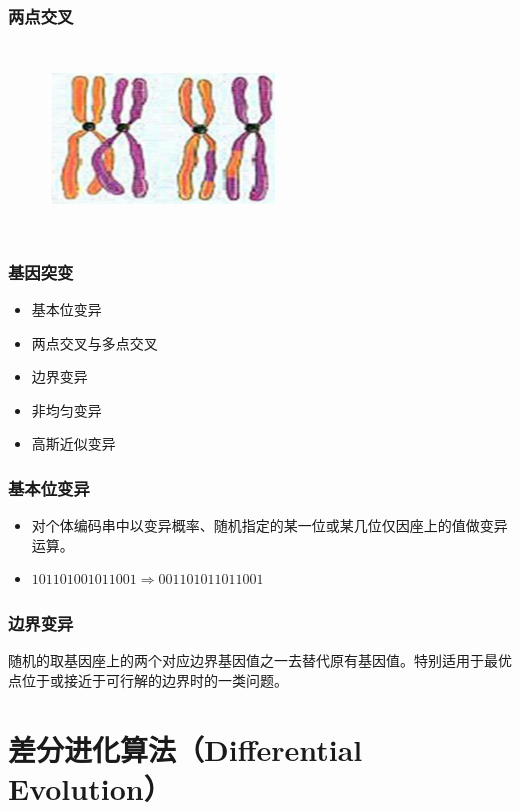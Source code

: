 \documentclass[handout]{beamer}
\begin{document}
			\begin{frame}
				\frametitle{两点交叉}
				
				\begin{figure}[htbp]
					\centering
					\includegraphics[width=6cm,height=5cm]{figure/5.png}
				\end{figure}
			\end{frame}
			
			\begin{frame}
				\frametitle{基因突变}
				\begin{itemize}
					\item 基本位变异
					\item 两点交叉与多点交叉
					\item 边界变异
					\item 非均匀变异	
					\item 高斯近似变异
				\end{itemize}
			\end{frame}           
			
			
			\begin{frame}
				\frametitle{基本位变异}
				\begin{itemize}
					\item 对个体编码串中以变异概率、随机指定的某一位或某几位仅因座上的值做变异运算。
					\item $101101001011001 \Rightarrow 001101011011001$
				\end{itemize}
			\end{frame}       
			
			\begin{frame}
				\frametitle{边界变异}
				随机的取基因座上的两个对应边界基因值之一去替代原有基因值。特别适用于最优点位于或接近于可行解的边界时的一类问题。
			
			\end{frame}     
				
		\section{差分进化算法（Differential Evolution）}
		
\end{document}
